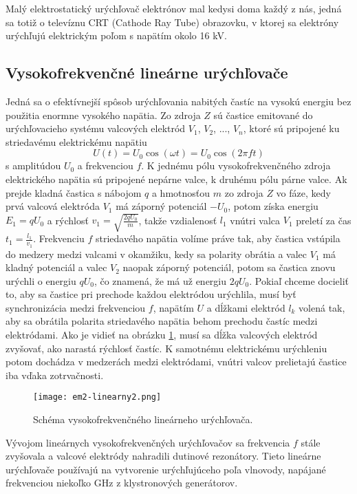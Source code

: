 \documentclass[../../main.tex]{subfiles}
\begin{document}
Malý elektrostatický urýchľovač elektrónov mal kedysi doma každý z nás, jedná sa totiž o televíznu CRT (Cathode Ray Tube) obrazovku, v ktorej sa elektróny urýchľujú elektrickým poľom s napätím okolo 16 kV.

\subsection{Vysokofrekvenčné lineárne urýchľovače}

Jedná sa o efektívnejší spôsob urýchľovania nabitých častíc na vysokú energiu bez použitia enormne vysokého napätia. Zo zdroja $Z$ sú častice emitované do urýchľovacieho systému valcových elektród $V_1$, $V_2$, ..., $V_n$, ktoré sú pripojené ku striedavému elektrickému napätiu
\begin{equation}
U(t)=U_0\cos(\omega t)=U_0\cos(2\pi ft)
\end{equation}
s amplitúdou $U_0$ a frekvenciou $f$. K jednému pólu vysokofrekvenčného zdroja elektrického napätia sú pripojené nepárne valce, k druhému pólu párne valce. Ak prejde kladná častica s nábojom $q$ a hmotnosťou $m$ zo zdroja $Z$ vo fáze, kedy prvá valcová elektróda $V_1$ má záporný potenciál $-U_0$, potom získa energiu $E_1=qU_0$ a rýchlosť $v_1=\sqrt{\frac{2qU_0}{m}}$, takže vzdialenosť $l_1$ vnútri valca $V_1$ preletí za čas $t_1=\frac{l_1}{v_1}$. Frekvenciu $f$ striedavého napätia volíme práve tak, aby častica vstúpila do medzery medzi valcami v okamžiku, kedy sa polarity obrátia a valec $V_1$ má kladný potenciál a valec $V_2$ naopak záporný potenciál, potom sa častica znovu urýchli o energiu $qU_0$, čo znamená, že má už energiu $2qU_0$. Pokiaľ chceme docieliť to, aby sa častice pri prechode každou elektródou urýchlila, musí byť synchronizácia medzi frekvenciou $f$, napätím $U$ a dĺžkami elektród $l_k$ volená tak, aby sa obrátila polarita striedavého napätia behom prechodu častíc medzi elektródami. Ako je vidieť na obrázku \ref{em2:img:linearny2}, musí sa dĺžka valcových elektród zvyšovať, ako narastá rýchlosť častíc. K samotnému elektrickému urýchleniu potom dochádza v medzerách medzi elektródami, vnútri valcov prelietajú častice iba vďaka zotrvačnosti.

\begin{figure}[h]
\centering
\texttt{[image: em2-linearny2.png]}
\caption{Schéma vysokofrekvenčného lineárneho urýchľovača.}
\label{em2:img:linearny2}
\end{figure}

Vývojom lineárnych vysokofrekvenčných urýchľovačov sa frekvencia $f$ stále zvyšovala a valcové elektródy nahradili dutinové rezonátory. Tieto lineárne urýchľovače používajú na vytvorenie urýchľujúceho poľa vlnovody, napájané frekvenciou niekoľko GHz z klystronových generátorov.
\end{document}
